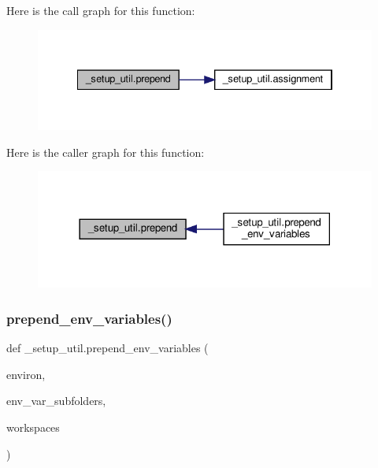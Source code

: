 Here is the call graph for this function\+:
\nopagebreak
\begin{figure}[H]
\begin{center}
\leavevmode
\includegraphics[width=334pt]{namespace__setup__util_ae78d86b2c4279f5b8b1acaa146c35802_cgraph}
\end{center}
\end{figure}
Here is the caller graph for this function\+:
\nopagebreak
\begin{figure}[H]
\begin{center}
\leavevmode
\includegraphics[width=318pt]{namespace__setup__util_ae78d86b2c4279f5b8b1acaa146c35802_icgraph}
\end{center}
\end{figure}
\mbox{\label{namespace__setup__util_a832417d18b85bd1d276a87547e86f860}} 
\subsubsection{\texorpdfstring{prepend\+\_\+env\+\_\+variables()}{prepend\_env\_variables()}}
{\footnotesize\ttfamily def \+\_\+setup\+\_\+util.\+prepend\+\_\+env\+\_\+variables (\begin{DoxyParamCaption}\item[{}]{environ,  }\item[{}]{env\+\_\+var\+\_\+subfolders,  }\item[{}]{workspaces }\end{DoxyParamCaption})}

